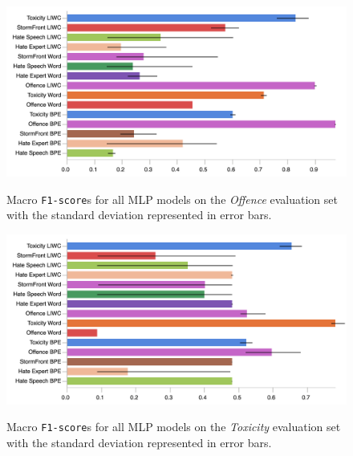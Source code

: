 \begin{figure}
\begin{minipage}{\textwidth}
    \centering
    \includegraphics[width=\textwidth]{all_mlp_davidson_test.pdf}
    \caption{Macro \texttt{F1-score}s for all MLP models on the \textit{Offence} evaluation set with the standard deviation represented in error bars.}
    \label{fig:davidson_mlp_test}
  \vfill
    \includegraphics[width=\textwidth]{all_mlp_wulczyn_test.pdf}
    \caption{Macro \texttt{F1-score}s for all MLP models on the \textit{Toxicity} evaluation set with the standard deviation represented in error bars.}
    \label{fig:wulczyn_mlp_test}
\end{minipage}
\end{figure}

